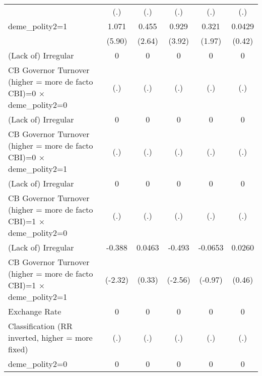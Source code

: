 {\begin{tabular}{l*{5}{c}}
                    &         (.)         &         (.)         &         (.)         &         (.)         &         (.)         \\
[1em]
deme\_polity2=1      &       1.071\sym{***}&       0.455\sym{**} &       0.929\sym{***}&       0.321         &      0.0429         \\
                    &      (5.90)         &      (2.64)         &      (3.92)         &      (1.97)         &      (0.42)         \\
[1em]
(Lack of) Irregular &           0         &           0         &           0         &           0         &           0         \\
CB Governor Turnover (higher = more de facto CBI)=0 $\times$ deme\_polity2=0&         (.)         &         (.)         &         (.)         &         (.)         &         (.)         \\
[1em]
(Lack of) Irregular &           0         &           0         &           0         &           0         &           0         \\
CB Governor Turnover (higher = more de facto CBI)=0 $\times$ deme\_polity2=1&         (.)         &         (.)         &         (.)         &         (.)         &         (.)         \\
[1em]
(Lack of) Irregular &           0         &           0         &           0         &           0         &           0         \\
CB Governor Turnover (higher = more de facto CBI)=1 $\times$ deme\_polity2=0&         (.)         &         (.)         &         (.)         &         (.)         &         (.)         \\
[1em]
(Lack of) Irregular &      -0.388\sym{*}  &      0.0463         &      -0.493\sym{*}  &     -0.0653         &      0.0260         \\
CB Governor Turnover (higher = more de facto CBI)=1 $\times$ deme\_polity2=1&     (-2.32)         &      (0.33)         &     (-2.56)         &     (-0.97)         &      (0.46)         \\
[1em]
Exchange Rate       &           0         &           0         &           0         &           0         &           0         \\
Classification (RR inverted, higher = more fixed)&         (.)         &         (.)         &         (.)         &         (.)         &         (.)         \\
[1em]
deme\_polity2=0      &           0         &           0         &           0         &           0         &           0         \\

\end{tabular}}
